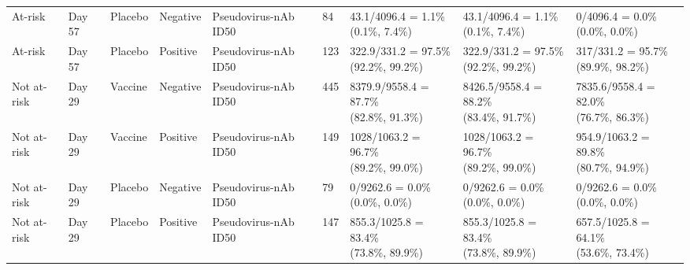 \documentclass[]{book}
\theoremstyle{definition}
\theoremstyle{definition}
\theoremstyle{definition}
\newcommand{\1}{\mathbbm{1}}
\begin{document}
\begin{landscape}
\begin{ThreePartTable}
\begin{longtable}[t]{>{\raggedright\arraybackslash}p{2.7cm}llllllll}
\hspace{1em}At-risk & Day 57 & Placebo & Negative & Pseudovirus-nAb ID50 & 84 & \makecell[l]{43.1/4096.4 = 1.1\%\\(0.1\%, 7.4\%)} & \makecell[l]{43.1/4096.4 = 1.1\%\\(0.1\%, 7.4\%)} & \makecell[l]{0/4096.4 = 0.0\%\\(0.0\%, 0.0\%)}\\
\hspace{1em}At-risk & Day 57 & Placebo & Positive & Pseudovirus-nAb ID50 & 123 & \makecell[l]{322.9/331.2 = 97.5\%\\(92.2\%, 99.2\%)} & \makecell[l]{322.9/331.2 = 97.5\%\\(92.2\%, 99.2\%)} & \makecell[l]{317/331.2 = 95.7\%\\(89.9\%, 98.2\%)}\\
\hspace{1em}Not at-risk & Day 29 & Vaccine & Negative & Pseudovirus-nAb ID50 & 445 & \makecell[l]{8379.9/9558.4 = 87.7\%\\(82.8\%, 91.3\%)} & \makecell[l]{8426.5/9558.4 = 88.2\%\\(83.4\%, 91.7\%)} & \makecell[l]{7835.6/9558.4 = 82.0\%\\(76.7\%, 86.3\%)}\\
\hspace{1em}Not at-risk & Day 29 & Vaccine & Positive & Pseudovirus-nAb ID50 & 149 & \makecell[l]{1028/1063.2 = 96.7\%\\(89.2\%, 99.0\%)} & \makecell[l]{1028/1063.2 = 96.7\%\\(89.2\%, 99.0\%)} & \makecell[l]{954.9/1063.2 = 89.8\%\\(80.7\%, 94.9\%)}\\
\hspace{1em}Not at-risk & Day 29 & Placebo & Negative & Pseudovirus-nAb ID50 & 79 & \makecell[l]{0/9262.6 = 0.0\%\\(0.0\%, 0.0\%)} & \makecell[l]{0/9262.6 = 0.0\%\\(0.0\%, 0.0\%)} & \makecell[l]{0/9262.6 = 0.0\%\\(0.0\%, 0.0\%)}\\
\hspace{1em}Not at-risk & Day 29 & Placebo & Positive & Pseudovirus-nAb ID50 & 147 & \makecell[l]{855.3/1025.8 = 83.4\%\\(73.8\%, 89.9\%)} & \makecell[l]{855.3/1025.8 = 83.4\%\\(73.8\%, 89.9\%)} & \makecell[l]{657.5/1025.8 = 64.1\%\\(53.6\%, 73.4\%)}\\

\end{longtable}
\end{ThreePartTable}
\end{landscape}
\end{document}
